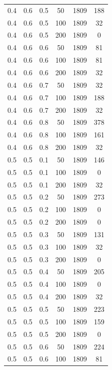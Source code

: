 \documentclass[a4paper,14pt, unknownkeysallowed]{extreport}
\begin{document}
\begin{center}
\begin{longtable}[c]{|c|c|c|c|c|c|}
	   \hline
		0.4 &  0.6 &  0.5 &   50 &  1809 &   188 \\
		0.4 &  0.6 &  0.5 &  100 &  1809 &    32 \\
		0.4 &  0.6 &  0.5 &  200 &  1809 &     0 \\
	   \hline
		0.4 &  0.6 &  0.6 &   50 &  1809 &    81 \\
		0.4 &  0.6 &  0.6 &  100 &  1809 &    81 \\
		0.4 &  0.6 &  0.6 &  200 &  1809 &    32 \\
	   \hline
		0.4 &  0.6 &  0.7 &   50 &  1809 &    32 \\
		0.4 &  0.6 &  0.7 &  100 &  1809 &   188 \\
		0.4 &  0.6 &  0.7 &  200 &  1809 &    32 \\
	   \hline
		0.4 &  0.6 &  0.8 &   50 &  1809 &   378 \\
		0.4 &  0.6 &  0.8 &  100 &  1809 &   161 \\
		0.4 &  0.6 &  0.8 &  200 &  1809 &    32 \\
	   \hline
		0.5 &  0.5 &  0.1 &   50 &  1809 &   146 \\
		0.5 &  0.5 &  0.1 &  100 &  1809 &     0 \\
		0.5 &  0.5 &  0.1 &  200 &  1809 &    32 \\
	   \hline
		0.5 &  0.5 &  0.2 &   50 &  1809 &   273 \\
		0.5 &  0.5 &  0.2 &  100 &  1809 &     0 \\
		0.5 &  0.5 &  0.2 &  200 &  1809 &     0 \\
	   \hline
		0.5 &  0.5 &  0.3 &   50 &  1809 &   131 \\
		0.5 &  0.5 &  0.3 &  100 &  1809 &    32 \\
		0.5 &  0.5 &  0.3 &  200 &  1809 &     0 \\
	   \hline
		0.5 &  0.5 &  0.4 &   50 &  1809 &   205 \\
		0.5 &  0.5 &  0.4 &  100 &  1809 &     0 \\
		0.5 &  0.5 &  0.4 &  200 &  1809 &    32 \\
	   \hline
		0.5 &  0.5 &  0.5 &   50 &  1809 &   223 \\
		0.5 &  0.5 &  0.5 &  100 &  1809 &   159 \\
		0.5 &  0.5 &  0.5 &  200 &  1809 &     0 \\
	   \hline
		0.5 &  0.5 &  0.6 &   50 &  1809 &   224 \\
		0.5 &  0.5 &  0.6 &  100 &  1809 &    81 \\

\end{longtable}
\end{center}
\end{document}
